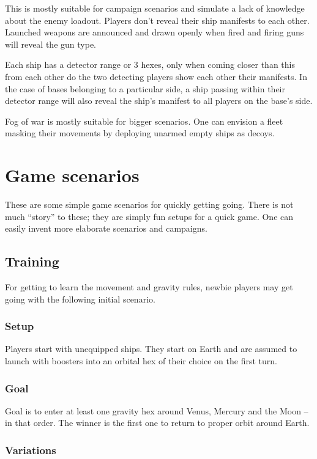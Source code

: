 \documentclass[a4paper,12pt,notitlepage,twocolumn]{article}
\begin{document}
This is mostly suitable for campaign scenarios and simulate a lack of
knowledge about the enemy loadout. Players don't reveal their ship manifests to each
other. Launched weapons are announced and drawn openly when fired
and firing guns will reveal the gun type. 

Each ship has a detector range or 3 hexes, only when coming closer
than this from each other do the two detecting players show each other
their manifests.  In the case of bases belonging to a
particular side, a ship passing within their detector range will also
reveal the ship's manifest to all players on the base's side. 

Fog of war is mostly suitable for bigger scenarios. One can envision a
fleet masking their movements by deploying unarmed empty ships as
decoys. 


\section{Game scenarios}
\label{sec:game_scenarios}

These are some simple game scenarios for quickly getting going. There
is not much ``story'' to these; they are simply
fun setups for a quick game. One can easily invent more elaborate
scenarios and campaigns. 

\subsection{Training}

For getting to learn the movement and gravity rules, newbie players
may get going with the following initial scenario.

\subsubsection*{Setup}
Players start with unequipped ships. They start on Earth and are
assumed to launch with boosters into an orbital hex of their choice on
the first turn.   

\subsubsection*{Goal}

Goal is to enter at least one gravity hex around
Venus, Mercury and the Moon -- in that order. The winner is the first
one to return to proper orbit around Earth. 


\subsubsection*{Variations}
\end{document}

